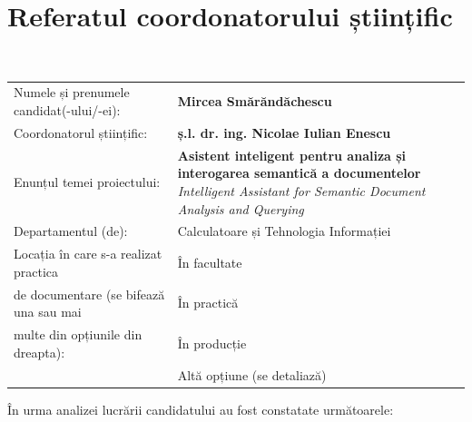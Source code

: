 \chapter*{Referatul coordonatorului științific}
~
\begin{tabular}{@{}p{0.44\textwidth}p{0.50\textwidth}@{}}
	Numele și prenumele candidat(-ului/-ei):\vspace{10pt} & \textbf{Mircea Smărăndăchescu} \\
	
	Coordonatorul științific:\vspace{10pt}  &	\textbf{ș.l. dr. ing. Nicolae Iulian Enescu} \\
	
	Enunțul temei proiectului:\vspace{10pt} & \parbox[t]{\linewidth}{\textbf{Asistent inteligent pentru analiza și interogarea semantică a documentelor}\\\textit{Intelligent Assistant for Semantic Document Analysis and Querying}}\\
	
	Departamentul (de):\vspace{10pt} &  Calculatoare și Tehnologia Informației\\
	
	Locația în care s-a realizat practica &\unCheckedBox\hspace{5pt} În facultate \\ 
	de documentare (se bifează una sau mai &   \hspace{4pt}\unCheckedBox\hspace{5pt} În practică\\
	multe din opțiunile din dreapta): & \hspace{4pt}\unCheckedBox\hspace{5pt} În producție\\
	\vspace{20pt}&\hspace{4pt}\unCheckedBox\hspace{5pt} Altă opțiune (se detaliază)\\
\end{tabular}

\begin{flushleft}
În urma analizei lucrării candidatului au fost constatate următoarele:
\end{flushleft}

